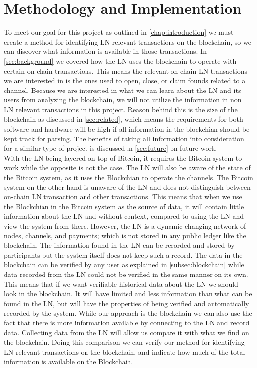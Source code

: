 \chapter{Methodology and Implementation}
\label{chap:metodology}

To meet our goal for this project as outlined in \cref{chap:introduction} we must create a method for identifying LN relevant transactions on the blockchain, so we can discover what information is available in those transactions. In \cref{sec:background} we covered how the LN uses the blockchain to operate with certain on-chain transactions. This means the relevant on-chain LN transactions we are interested in is the ones used to open, close, or claim founds related to a channel. Because we are interested in what we can learn about the LN and its users from analyzing the blockchain, we will not utilize the information in non LN relevant transactions in this project. Reason behind this is the size of the blockchain as discussed in \cref{sec:related}, which means the requirements for both software and hardware will be high if all information in the blockchian should be kept track for parsing. The benefits of taking all information into consideration for a similar type of project is discussed in \cref{sec:future} on future work. 
\\

With the LN being layered on top of Bitcoin, it requires the Bitcoin system to work while the opposite is not the case. The LN will also be aware of the state of the Bitcoin system, as it uses the Blockchian to operate the channels. The Bitcoin system on the other hand is unaware of the LN and does not distinguish between on-chain LN transaction and other transactions. This means that when we use the Blockchian in the Bitcoin system as the source of data, it will contain little information about the LN and without context, compared to using the LN and view the system from there. However, the LN is a dynamic changing network of nodes, channels, and payments; which is not stored in any public ledger like the blockchain. The information found in the LN can be recorded and stored by participants but the system itself does not keep such a record. The data in the blockchain can be verified by any user as explained in \cref{subsec:blockchain} while data recorded from the LN could not be verified in the same manner on its own.
This means that if we want verifiable historical data about the LN we should look in the blockchain. It will have limited and less information than what can be found in the LN, but will have the properties of being verified and automatically recorded by the system.
While our approach is the blockchain we can also use the fact that there is more information available by connecting to the LN and record data. Collecting data from the LN will allow us compare it with what we find on the blockchain. Doing this comparison we can verify our method for identifying LN relevant transactions on the blockchain, and indicate how much of the total information is available on the Blockchain.
\\

